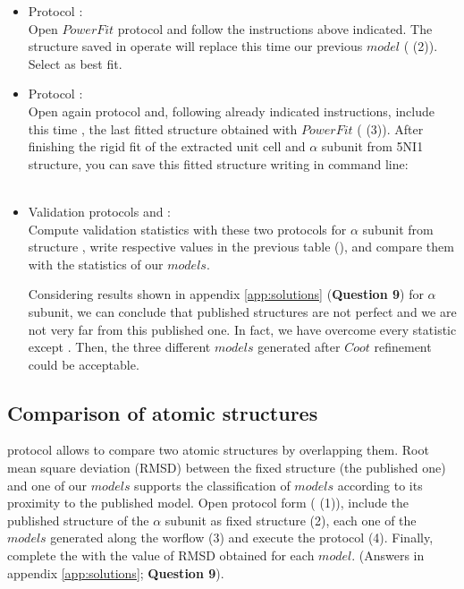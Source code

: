 \begin{itemize}
\begin{itemize}
    \item Protocol :\\
    Open $PowerFit$ protocol and follow the instructions above indicated. The structure saved in \chimera operate will replace this time our previous $model$ ( (2)). Select  as best fit.\\
    
    \item Protocol :\\
    Open again \chimera {} protocol and, following already indicated instructions, include this time , the last fitted structure obtained with $PowerFit$ ( (3)). After finishing the rigid fit of the extracted unit cell and  $\alpha$ subunit from 5NI1 structure, you can save this fitted structure writing in \chimera command line:\\
    \\
    
    \item Validation protocols  and :\\
    Compute validation statistics with these two protocols for  $\alpha$ subunit from  structure , write respective values in the previous table (), and compare them with the statistics of our $models$.
    
    Considering results shown in appendix \ref{app:solutions} (\textbf{Question 9}) for  $\alpha$ subunit, we can conclude that published structures are not perfect and we are not very far from this published one. In fact, we have overcome every statistic except \ccmask. Then, the three different $models$ generated after $Coot$ refinement could be acceptable. \\

  \end{itemize}
 
  \subsection*{Comparison of atomic structures}
  
  \phenix protocol  allows to compare two atomic structures by overlapping them. Root mean square deviation (RMSD) between the fixed structure (the published one) and one of our $models$ supports the classification of $models$ according to its proximity to the published model. Open \phenix {} protocol form ( (1)), include the published structure of the  $\alpha$ subunit as fixed structure (2), each one of the $models$ generated along the worflow (3) and execute the protocol (4). Finally, complete the  with the value of RMSD obtained for each $model$. (Answers in appendix \ref{app:solutions}; \textbf{Question 9}).
  

\end{itemize}

